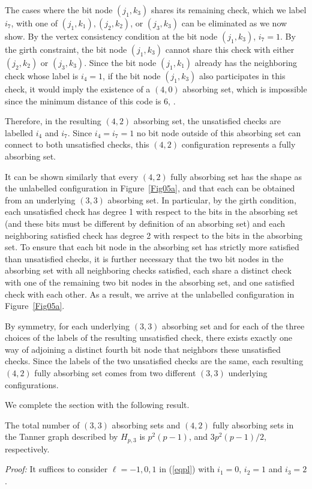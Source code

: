 The cases where the bit node $(j_1,k_3)$ shares its remaining check,
which we label $i_7$, with one of $(j_1,k_1), (j_2,k_2)$, or
$(j_3,k_3)$ can be eliminated as we now show. By the vertex
consistency condition at the bit node $(j_1,k_3)$, $i_7=1$. By the
girth constraint, the bit node $(j_1,k_3)$ cannot share this check
with either $(j_2,k_2)$ or $(j_3,k_3)$. Since the bit node
$(j_1,k_1)$ already has the neighboring check whose label is
$i_4=1$, if the bit node $(j_1,k_3)$ also participates in this
check, it would imply the existence of a $(4,0)$ absorbing set,
which is impossible since the minimum distance of this code is 6,
\cite{helles}.

Therefore, in the resulting $(4,2)$ absorbing set, the unsatisfied
checks are labelled $i_4$ and $i_7$. Since $i_4=i_7=1$ no bit node
outside of this absorbing set can connect to both unsatisfied
checks, this $(4,2)$ configuration represents a fully absorbing
set.


It can be shown similarly that every $(4,2)$ fully absorbing set
has the shape as the unlabelled configuration in
Figure~\ref{Fig05a}, and that each can be obtained from an
underlying $(3,3)$ absorbing set. In particular, by the girth
condition, each unsatisfied check has degree 1 with respect to the
bits in the absorbing set (and these bits must be different by
definition of an absorbing set) and each neighboring satisfied
check has degree 2 with respect to the bits in the absorbing set.
To ensure that each bit node in the absorbing set has strictly
more satisfied than unsatisfied checks, it is further necessary
that the two bit nodes in the absorbing set with all neighboring
checks satisfied, each share a distinct check with one of the
remaining two bit nodes in the absorbing set, and one satisfied
check with each other. As a result, we arrive at the unlabelled
configuration in Figure~\ref{Fig05a}.


By symmetry, for each underlying $(3,3)$ absorbing set and for
each of the three choices of the labels of the resulting
unsatisfied check, there exists exactly one way of adjoining a
distinct fourth bit node that neighbors these unsatisfied checks.
Since the labels of the two unsatisfied checks are the same, each
resulting $(4,2)$ fully absorbing set comes from two different
$(3,3)$ underlying configurations.

 We complete the section with the following result.
\begin{lemma}\label{le11} The total number of $(3,3)$ absorbing sets and $(4,2)$ fully absorbing sets
in the Tanner graph described by $H_{p,3}$ is $p^2(p-1)$, and
$3p^2(p-1)/2$, respectively.
\end{lemma}
\noindent \textit{Proof:} It suffices to consider $\ell=-1,0,1$ in
(\ref{eqpl}) with $i_1=0$, $i_2=1$ and $i_3=2$.

